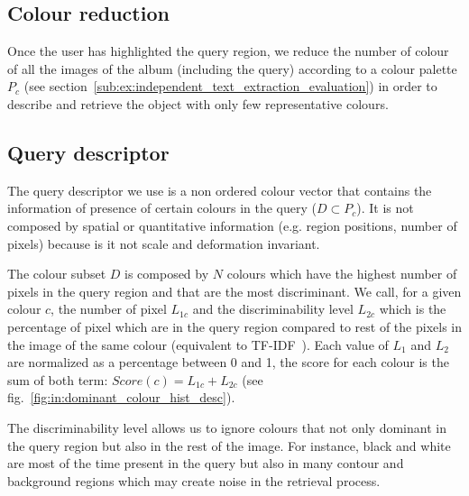 \subsection{Colour reduction}
Once the user has highlighted the query region, we reduce the number of colour of all the images of the album (including the query) according to a colour palette $P_c$ (see section~\ref{sub:ex:independent_text_extraction_evaluation}) in order to describe and retrieve the object with only few representative colours. 


\subsection{Query descriptor}

The query descriptor we use is a non ordered colour vector that contains the information of presence of certain colours in the query ($D \subset P_c$). It is not composed by spatial or quantitative information (e.g. region positions, number of pixels) because is it not scale and deformation invariant.%

The colour subset $D$ is composed by $N$ colours which have the highest number of pixels in the query region and that are the most discriminant. We call, for a given colour $c$, the number of pixel $L_{1c}$ and the discriminability level $L_{2c}$ which is the percentage of pixel which are in the query region compared to rest of the pixels in the image of the same colour (equivalent to TF-IDF~\cite{salton1986introduction}). Each value of $L_1$ and $L_2$ are normalized as a percentage between 0 and 1, the score for each colour is the sum of both term: $Score(c) = L_{1c} + L_{2c}$ (see fig.~\ref{fig:in:dominant_colour_hist_desc}).

The discriminability level allows us to ignore colours that not only dominant in the query region but also in the rest of the image. For instance, black and white are most of the time present in the query but also in many contour and background regions which may create noise in the retrieval process.


